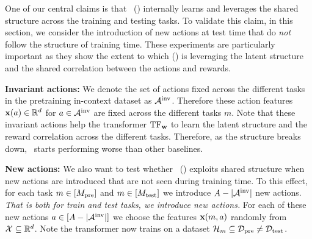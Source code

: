 One of our central claims is that \pred\ (\gt) internally learns and leverages the shared structure across the training and testing tasks.
% 
To validate this claim, in this section, we consider the introduction of new actions at test time that do \textit{not} follow the structure of training time.
%
These experiments are particularly important as they show the extent to which \pred (\gt) is leveraging the latent structure and the shared correlation between the actions and rewards.


\textbf{Invariant actions:} We denote the set of actions fixed across the different tasks in the pretraining in-context dataset as $\mathcal{A}^{\text{inv}}$. Therefore these action features $\mathbf{x}(a)\in\mathbb{R}^d$ for $a\in \mathcal{A}^{\text{inv}}$ are fixed across the different tasks $m$. Note that these invariant actions help the transformer $\mathrm{TF}_{\mathbf{w}}$ to learn the latent structure and the reward correlation across the different tasks. Therefore, as the structure breaks down, \pred\ starts performing worse than other baselines.

\textbf{New actions:} We also want to test whether \pred\ (\gt) exploits shared structure when new actions are introduced that are not seen during training time. To this effect, for each task $m\in [M_{\text{pre}}]$ and $m\in [M_{\text{test}}]$ we introduce $A - |\mathcal{A}^{\text{inv}}|$ new actions. \textit{That is both for train and test tasks, we introduce new actions.}  For each of these new actions $a\in [A - |\mathcal{A}^{\text{inv}}|]$ we choose the features $\mathbf{x}(m,a)$ randomly from $\mathcal{X}\subseteq\mathbb{R}^d$. Note the transformer now trains on a dataset $\mathcal{H}_m \subseteq \mathcal{D}_{\text{pre}} \neq \mathcal{D}_{\text{test}}$.  



